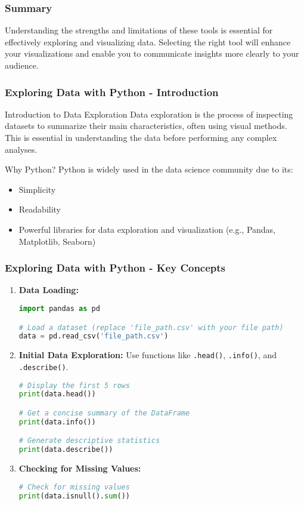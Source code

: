 \documentclass[aspectratio=169]{beamer}
\begin{document}
\begin{frame}
    \frametitle{Summary}
    Understanding the strengths and limitations of these tools is essential for effectively exploring and visualizing data. Selecting the right tool will enhance your visualizations and enable you to communicate insights more clearly to your audience.
\end{frame}

\begin{frame}[fragile]
    \frametitle{Exploring Data with Python - Introduction}
    \begin{block}{Introduction to Data Exploration}
        Data exploration is the process of inspecting datasets to summarize their main characteristics, often using visual methods. 
        This is essential in understanding the data before performing any complex analyses.
    \end{block}
    
    \begin{block}{Why Python?}
        Python is widely used in the data science community due to its:
        \begin{itemize}
            \item Simplicity
            \item Readability
            \item Powerful libraries for data exploration and visualization (e.g., Pandas, Matplotlib, Seaborn)
        \end{itemize}
    \end{block}
\end{frame}

\begin{frame}[fragile]
    \frametitle{Exploring Data with Python - Key Concepts}
    \begin{enumerate}
        \item \textbf{Data Loading:}
        \begin{lstlisting}[language=Python]
import pandas as pd

# Load a dataset (replace 'file_path.csv' with your file path)
data = pd.read_csv('file_path.csv')
        \end{lstlisting}

        \item \textbf{Initial Data Exploration:}
        Use functions like \texttt{.head()}, \texttt{.info()}, and \texttt{.describe()}.
        \begin{lstlisting}[language=Python]
# Display the first 5 rows
print(data.head())

# Get a concise summary of the DataFrame
print(data.info())

# Generate descriptive statistics
print(data.describe())
        \end{lstlisting}

        \item \textbf{Checking for Missing Values:}
        \begin{lstlisting}[language=Python]
# Check for missing values
print(data.isnull().sum())
        \end{lstlisting}
    \end{enumerate}
\end{frame}
\end{document}
